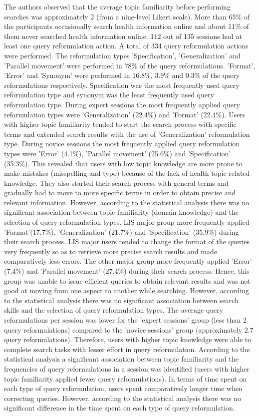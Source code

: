 \documentclass[]{article}
\begin{document}
The authors observed that the average topic familiarity before performing searches was approximately 2 (from a nine-level Likert scale). More than 65\% of the participants occasionally search health information online and about 11\% of them never searched health information online. 112 out of 135 sessions had at least one query reformulation action. A total of 334 query reformulation actions were performed. The reformulation types 'Specification', 'Generalization' and 'Parallel movement' were performed in 78\% of the query reformulations. 'Format', 'Error' and 'Synonym' were performed in 16.8\%, 3.9\% and 0.3\% of the query reformulations respectively. Specification was the most frequently used query reformulation type and synonym was the least frequently used query reformulation type. During expert sessions the most frequently applied query reformulation types were 'Generalization' (22.4\%) and 'Format' (22.4\%). Users with higher topic familiarity tended to start the search process with specific terms and extended search results with the use of 'Generalization' reformulation type. During novice sessions the most frequently applied query reformulation types were 'Error' (4.1\%), 'Parallel movement' (25.6\%) and 'Specification' (35.3\%). This revealed that users with low topic knowledge are more prone to make mistakes (misspelling and typo) because of the lack of health topic related knowledge. They also started their search process with general terms and gradually had to move to more specific terms in order to obtain precise and relevant information. However, according to the statistical analysis there was no significant association between topic familiarity (domain knowledge) and the selection of query reformulation types. LIS major group more frequently applied 'Format'(17.7\%), 'Generalization' (21.7\%) and 'Specification' (35.9\%) during their search process. LIS major users tended to change the format of the queries very frequently so as to retrieve more precise search results and made comparatively less errors. The other major group more frequently applied 'Error' (7.4\%) and 'Parallel movement' (27.4\%) during their search process. Hence, this group was unable to issue efficient queries to obtain relevant results and was not good at moving from one aspect to another while searching. However, according to the statistical analysis there was no significant association between search skills and the selection of query reformulation types.  The average query reformulations per session was lower for the 'expert sessions' group (less than 2 query reformulations) compared to the 'novice sessions' group (approximately 2.7 query reformulations). Therefore, users with higher topic knowledge were able to complete search tasks with lesser effort in query reformulation. According to the statistical analysis a significant association between topic familiarity and the frequencies of query reformulations in a session was identified (users with higher topic familiarity applied fewer query reformulations). In terms of time spent on each type of query reformulation, users spent comparatively longer time when correcting queries. However, according to the statistical analysis there was no significant difference in the time spent on each type of query reformulation.   
\end{document}

